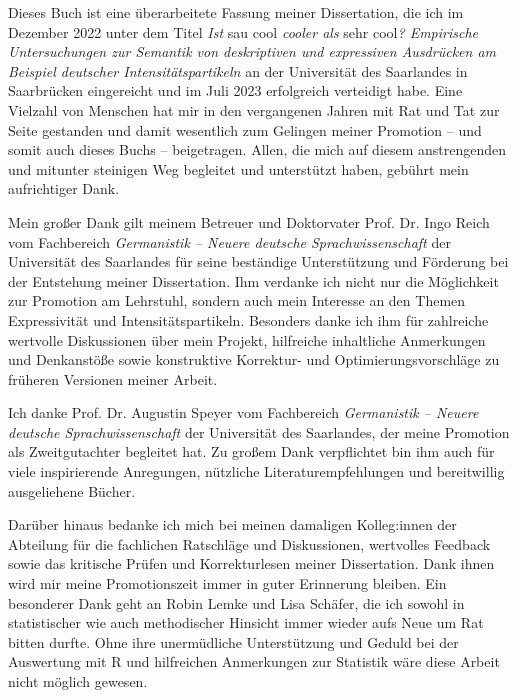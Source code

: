 \addchap{\lsAcknowledgementTitle}
\markdouble{\lsAcknowledgementTitle}

\noindent Dieses Buch ist eine überarbeitete Fassung meiner Dissertation, die ich im
Dezember 2022 unter dem Titel \textit{Ist} sau cool \textit{cooler als} sehr cool\textit{? Empirische Untersuchungen zur Semantik von deskriptiven und expressiven Ausdrücken am
Beispiel deutscher Intensitätspartikeln} an der Universität des Saarlandes in Saarbrücken eingereicht und im Juli 2023 erfolgreich verteidigt habe. Eine Vielzahl von Menschen hat mir in den vergangenen Jahren mit Rat und Tat zur Seite gestanden und damit wesentlich zum Gelingen meiner Promotion -- und somit auch dieses Buchs -- beigetragen. Allen, die mich auf diesem anstrengenden und mitunter steinigen Weg begleitet und unterstützt haben, gebührt mein aufrichtiger Dank.


Mein großer Dank gilt meinem Betreuer und Doktorvater Prof. Dr. Ingo Reich vom Fachbereich \textit{Germanistik -- Neuere deutsche Sprachwissenschaft} der Universität des Saarlandes für seine beständige Unterstützung und Förderung bei der Entstehung meiner Dissertation. Ihm verdanke ich nicht nur die Möglichkeit zur Promotion am Lehrstuhl, sondern auch mein Interesse an den Themen Expressivität und Intensitätspartikeln. Besonders danke ich ihm für zahlreiche wertvolle Diskussionen über mein Projekt, hilfreiche inhaltliche Anmerkungen und Denkanstöße sowie konstruktive Korrektur- und Optimierungsvorschläge zu früheren Versionen meiner Arbeit.


Ich danke Prof. Dr. Augustin Speyer vom Fachbereich \textit{Germanistik -- Neuere deutsche Sprachwissenschaft} der Universität des Saarlandes, der meine Promotion als Zweitgutachter begleitet hat. Zu großem Dank verpflichtet bin ihm auch für viele inspirierende Anregungen,  nützliche Literaturempfehlungen und bereitwillig ausgeliehene Bücher.


Darüber hinaus bedanke ich mich bei meinen damaligen Kolleg:innen der Abteilung für die fachlichen Ratschläge und Diskussionen, wertvolles Feedback sowie das kritische Prüfen und Korrekturlesen meiner Dissertation. Dank ihnen wird mir meine Promotionszeit immer in guter Erinnerung bleiben. Ein besonderer Dank geht an Robin Lemke und Lisa Schäfer, die ich sowohl in statistischer wie auch methodischer Hinsicht immer wieder aufs Neue um Rat bitten durfte. Ohne ihre unermüdliche Unterstützung und Geduld bei der Auswertung mit R und hilfreichen Anmerkungen zur Statistik wäre diese Arbeit nicht möglich gewesen.



